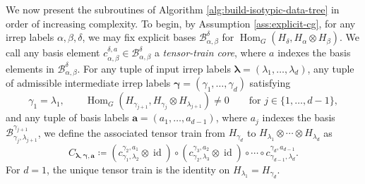 \documentclass[11pt]{article}
\newcommand{\scB}{\mathcal{B}}
\newcommand{\HomG}[2]{\operatorname{Hom}_G\!\left(#1,#2\right)}
\newcommand{\id}{\operatorname{id}}
\newcommand{\set}[1]{\{#1\}}
\theoremstyle{definition}
\begin{document}
We now present the subroutines of Algorithm \ref{alg:build-isotypic-data-tree} in order of increasing complexity. To begin, by Assumption \ref{ass:explicit-cg}, for any irrep labels $\alpha,\beta,\delta$, we may fix explicit bases $\scB_{\alpha,\beta}^{\delta}$ for $\HomG{H_\delta}{H_\alpha\otimes H_\beta}$. We call any basis element $c_{\alpha,\beta}^{\delta,a}\in\scB_{\alpha,\beta}^{\delta}$ a \emph{tensor-train core}, where $a$ indexes the basis elements in $\scB_{\alpha,\beta}^{\delta}$. For any tuple of input irrep labels $\boldsymbol{\lambda}=(\lambda_1,\dots,\lambda_d)$, any tuple of admissible intermediate irrep labels $\boldsymbol{\gamma}=(\gamma_1,\dots,\gamma_d)$ satisfying
\[
  \gamma_1=\lambda_1,
  \qquad
  \HomG{H_{\gamma_{j+1}}}{H_{\gamma_j}\otimes H_{\lambda_{j+1}}}\neq 0
  \qquad
  \text{for } j\in\set{1,\dots,d-1},
\]
and any tuple of basis labels $\boldsymbol{a}=(a_1,\dots,a_{d-1})$, where $a_j$ indexes the basis $\scB_{\gamma_j,\lambda_{j+1}}^{\gamma_{j+1}}$, we define the associated tensor train from $H_{\gamma_d}$ to $H_{\lambda_1}\otimes\cdots\otimes H_{\lambda_d}$ as
\begin{equation}\label{eq:general-tensor-train-map}
  C_{\boldsymbol{\lambda},\boldsymbol{\gamma},\boldsymbol{a}}
  \coloneq
  (c_{\gamma_1,\lambda_2}^{\gamma_2,a_1}\otimes \id)
  \circ
  (c_{\gamma_2,\lambda_3}^{\gamma_3,a_2}\otimes \id)
  \circ\cdots\circ
  c_{\gamma_{d-1},\lambda_d}^{\gamma_d,a_{d-1}}.
\end{equation}
For $d=1$, the unique tensor train is the identity on $H_{\lambda_1}=H_{\gamma_d}$.
\end{document}

